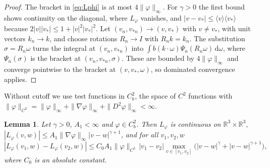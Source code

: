 \documentclass[11pt]{amsart}
\newtheorem{lemma}[theorem]{Lemma}
\theoremstyle{definition}
\newcommand{\RR}{\mathbb{R}}
\newcommand{\dd}{\,\mathrm{d}}
\newcommand{\jb}[1]{\langle #1\rangle}
\begin{document}
\begin{proof}
The bracket in \eqref{eq:Lphi} is at most $4\|\varphi\|_\infty$. For $\gamma>0$ the first bound shows continuity on the diagonal, where $L_\varphi$ vanishes, and $|v-v_*|\le\jb{v}\jb{v_*}$ because $2|v||v_*|\le1+|v|^2|v_*|^2$. Let $(v_n,v_{*n})\to(v,v_*)$ with $v\ne v_*$, with unit vectors $k_n\to k$, and choose rotations $R_n\to I$ with $R_nk=k_n$. The substitution $\sigma=R_n\omega$ turns the integral at $(v_n,v_{*n})$ into $\int b(k\cdot\omega)\Psi_n(R_n\omega)\dd\omega$, where $\Psi_n(\sigma)$ is the bracket at $(v_n,v_{*n},\sigma)$. These are bounded by $4\|\varphi\|_\infty$ and converge pointwise to the bracket at $(v,v_*,\omega)$, so dominated convergence applies.
\end{proof}

Without cutoff we use test functions in $C^2_b$, the space of $C^2$ functions with $\|\varphi\|_{C^2}=\|\varphi\|_\infty+\|\nabla\varphi\|_\infty+\|D^2\varphi\|_\infty<\infty$.

\begin{lemma}\label{lem:reg}
Let $\gamma>0$, $A_1<\infty$ and $\varphi\in C^2_b$. Then $L_\varphi$ is continuous on $\RR^3\times\RR^3$, $|L_\varphi(v,w)|\le A_1\|\nabla\varphi\|_\infty|v-w|^{\gamma+1}$, and for all $v_1,v_2,w$
\[
|L_\varphi(v_1,w)-L_\varphi(v_2,w)|\le C_0A_1\|\varphi\|_{C^2}\,|v_1-v_2|\max_{v\in[v_1,v_2]}\big(|v-w|^\gamma+|v-w|^{\gamma+1}\big),
\]
where $C_0$ is an absolute constant.
\end{lemma}
\end{document}
